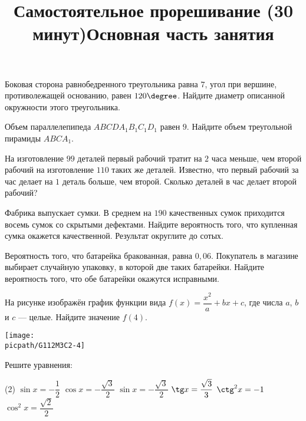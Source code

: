 \begin{class}[number=4]
	\title{Самостоятельное прорешивание (30 минут)}
	\begin{listofex}
		\item Боковая сторона равнобедренного треугольника равна \( 7 \), угол при вершине, противолежащей основанию, равен \( 120\degree \). Найдите диаметр описанной окружности этого треугольника.
		\item Объем параллелепипеда \( ABCDA_1B_1C_1D_1 \) равен \( 9 \). Найдите объем треугольной пирамиды \( ABCA_1 \).
		\item На изготовление \( 99 \) деталей первый рабочий тратит на \( 2 \) часа меньше, чем второй рабочий на изготовление \( 110 \) таких же деталей. Известно, что первый рабочий за час делает на \( 1 \) деталь больше, чем второй. Сколько деталей в час делает второй рабочий?
		\item Фабрика выпускает сумки. В среднем на \( 190 \) качественных сумок приходится восемь сумок со скрытыми дефектами. Найдите вероятность того, что купленная сумка окажется качественной. Результат округлите до сотых.
		\item Вероятность того, что батарейка бракованная, равна \( 0,06 \). Покупатель в магазине выбирает случайную упаковку, в которой две таких батарейки. Найдите вероятность того, что обе батарейки окажутся исправными.
		\item На рисунке изображён график функции вида \( f(x)=\dfrac{x^2}{a}+bx+c \),  где числа \( a \), \( b \) и \( c \) --- целые. Найдите значение \( f(4) \).
		\begin{center}
			\texttt{[image: \\picpath/G112M3C2-4]}
		\end{center}
	\end{listofex}
	\newpage
	\title{Основная часть занятия}
	\begin{listofex}
		\item Решите уравнения:
		\begin{tasks}(2)
			\task \( \sin x=-\dfrac{1}{2} \)
			\task \( \cos x=-\dfrac{\sqrt{3}}{2} \)
			\task \( \sin x = -\dfrac{\sqrt{3}}{2} \)
			\task \( \tg x = \dfrac{\sqrt{3}}{3} \)
			\task \( \ctg^2 x = -1 \)
			\task \( \cos^2 x = \dfrac{\sqrt{2}}{2} \)
		\end{tasks}

\end{listofex}
\end{class}
